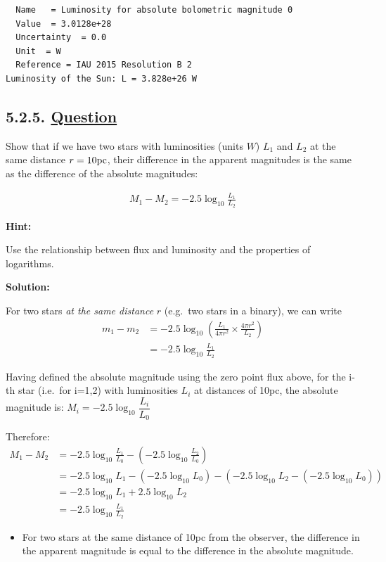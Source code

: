 \documentclass[
  letterpaper,
  DIV=11,
  numbers=noendperiod]{scrreprt}
\providecommand{\tightlist}{%
  \setlength{\itemsep}{0pt}\setlength{\parskip}{0pt}}\usepackage{longtable,booktabs,array}
\begin{document}
\begin{verbatim}
  Name   = Luminosity for absolute bolometric magnitude 0
  Value  = 3.0128e+28
  Uncertainty  = 0.0
  Unit  = W
  Reference = IAU 2015 Resolution B 2
Luminosity of the Sun: L = 3.828e+26 W
\end{verbatim}

\hypertarget{question-2}{%
\subsection{\texorpdfstring{5.2.5.
\protect\hyperlink{toc0_}{Question}}{5.2.5. Question}}\label{question-2}}

Show that if we have two stars with luminosities (units \(W\)) \(L_1\)
and \(L_2\) at the same distance \(r=10\rm{pc}\), their difference in
the apparent magnitudes is the same as the difference of the absolute
magnitudes:

\begin{align}
M_1 - M_2 = -2.5 \log_{10} \frac{L_1}{L_2}
\end{align}

\textbf{Hint:}

Use the relationship between flux and luminosity and the properties of
logarithms.

\textbf{Solution:}

For two stars \emph{at the same distance} \(r\) (e.g.~two stars in a
binary), we can write \begin{align}
m_1 - m_2 &= -2.5\log_{10}\left(\frac{L_1}{4\pi r^2} \times \frac{4\pi r^2}{L_2} \right)\\
&= -2.5\log_{10}\frac{L_1}{L_2}
\end{align}

Having defined the absolute magnitude using the zero point flux above,
for the i-th star (i.e.~for i=1,2) with luminosities \(L_i\) at
distances of 10pc, the absolute magnitude is:
\(M_i = -2.5 \log_{10}{\dfrac{L_i}{L_0}}\)

Therefore: \begin{align*}
M_1 - M_2 & = -2.5 \log_{10}{\frac{L_1}{L_0}} - \left(-2.5 \log_{10}{\frac{L_2}{L_0}}\right) \\
& = -2.5\log_{10} L_1 - ( -2.5\log_{10} L_0) - ( -2.5\log_{10} L_2 - ( -2.5\log_{10} L_0)) \\
& = -2.5 \log_{10} L_1 + 2.5 \log_{10} L_2\\
& = -2.5 \log_{10}{\frac{L_1}{L_2}}
\end{align*}

\begin{itemize}
\tightlist
\item
  For two stars at the same distance of 10pc from the observer, the
  difference in the apparent magnitude is equal to the difference in the
  absolute magnitude.
\end{itemize}
\end{document}
